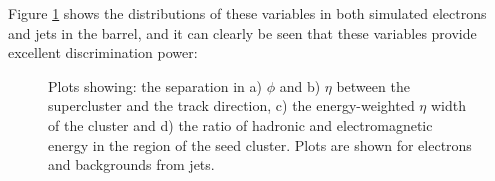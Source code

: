 Figure \ref{fig:electronID} shows the distributions of these variables in both simulated
electrons and jets in the barrel, and it can clearly be seen that these variables provide
excellent discrimination power:

\begin{figure}
\begin{center}

\end{center}
\caption{
    Plots showing: the separation in a) $\phi$ and b) $\eta$ between the supercluster and the
    track direction, c) the energy-weighted $\eta$ width of the cluster and d)
    the ratio of hadronic and electromagnetic energy in the region of the seed
    cluster. Plots are shown for electrons and backgrounds from jets. 
}
\label{fig:electronID}
\end{figure} 

